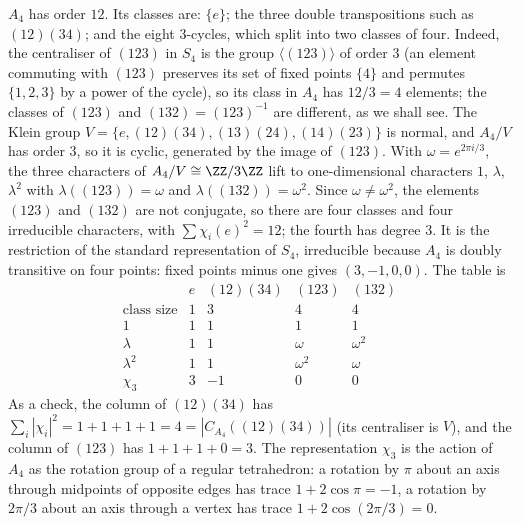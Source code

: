 \begin{example}\label{representation-theory:example-character-table-a4}
$A_4$ has order $12$. Its classes are: $\{e\}$; the three double transpositions such as $(12)(34)$; and the eight $3$-cycles, which split into two classes of four.
Indeed, the centraliser of $(123)$ in $S_4$ is the group $\langle(123)\rangle$ of order $3$ (an element commuting with $(123)$ preserves its set of fixed points $\{4\}$ and
permutes $\{1, 2, 3\}$ by a power of the cycle), so its class in $A_4$ has $12/3 = 4$ elements; the classes of $(123)$ and $(132) = (123)^{-1}$ are different, as we shall see. The Klein group $V = \{e, (12)(34),
(13)(24), (14)(23)\}$ is normal, and $A_4/V$ has order $3$, so it is cyclic, generated by the image of $(123)$. With $\omega = e^{2\pi i/3}$, the three characters of $A_4/V \cong \ZZ/3\ZZ$ lift to one-dimensional characters
$1$, $\lambda$, $\lambda^2$ with $\lambda((123)) = \omega$ and $\lambda((132)) = \omega^2$. Since $\omega \neq \omega^2$, the elements $(123)$ and $(132)$ are not conjugate, so there are
four classes and four irreducible characters, with $\sum\chi_i(e)^2 = 12$; the fourth has degree $3$. It is the restriction of the standard representation of $S_4$, irreducible
because $A_4$ is doubly transitive on four points: fixed points minus one gives $(3, -1, 0, 0)$. The table is
\[
\begin{array}{c|cccc}
 & e & (12)(34) & (123) & (132)\\
\text{class size} & 1 & 3 & 4 & 4\\
\hline
1 & 1 & 1 & 1 & 1\\
\lambda & 1 & 1 & \omega & \omega^2\\
\lambda^2 & 1 & 1 & \omega^2 & \omega\\
\chi_3 & 3 & -1 & 0 & 0
\end{array}
\]
As a check, the column of $(12)(34)$ has $\sum_i|\chi_i|^2 = 1 + 1 + 1 + 1 = 4 = |C_{A_4}((12)(34))|$ (its centraliser is $V$), and the column of $(123)$ has $1 + 1 + 1 + 0 = 3$.
The representation $\chi_3$ is the action of $A_4$ as the rotation group of a regular tetrahedron: a rotation by $\pi$ about an axis through midpoints of opposite edges has trace
$1 + 2\cos\pi = -1$, a rotation by $2\pi/3$ about an axis through a vertex has trace $1 + 2\cos(2\pi/3) = 0$.
\end{example}

